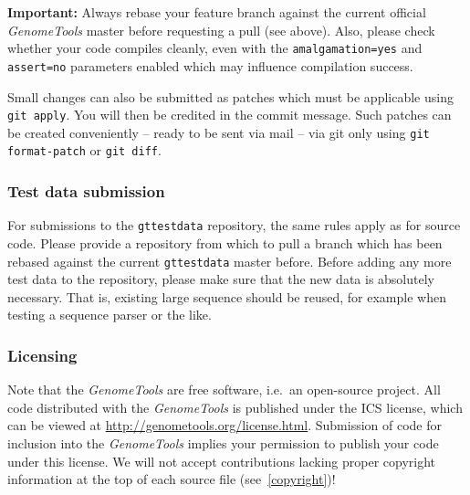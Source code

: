 \documentclass[11pt,final]{article}
\newcommand{\keyword}[1]{\lstinline{#1}}
\newcommand{\Gt}[0]{\emph{GenomeTools}\xspace}
\begin{document}
\textbf{Important:} Always rebase your feature branch against the current
official \Gt master before requesting a pull (see above). Also, please check
whether your code compiles cleanly, even with the \keyword{amalgamation=yes}
and \keyword{assert=no} parameters enabled which may influence compilation
success.

Small changes can also be submitted as patches which must be applicable using
\keyword{git apply}. You will then be credited in the commit message. Such
patches can be created conveniently -- ready to be sent via mail -- via git
only using \keyword{git format-patch} or \keyword{git diff}.

\subsubsection{Test data submission}

For submissions to the \keyword{gttestdata} repository, the same rules apply
as for source code. Please provide a repository from which to pull a branch
which has been rebased against the current \keyword{gttestdata} master before.
Before adding any more test data to the repository, please make sure that
the new data is absolutely necessary. That is, existing large sequence should be
reused, for example when testing a sequence parser or the like.

\subsubsection{Licensing}

Note that the \Gt are free software, i.e.\ an open-source project.
All code distributed with the \Gt is published under the ICS license,
which can be viewed at \url{http://genometools.org/license.html}. Submission of
code for inclusion into the \Gt implies your permission to publish your code
under this license. We will not accept contributions lacking proper
copyright information at the top of each source file (see~\ref{copyright})!
\end{document}
